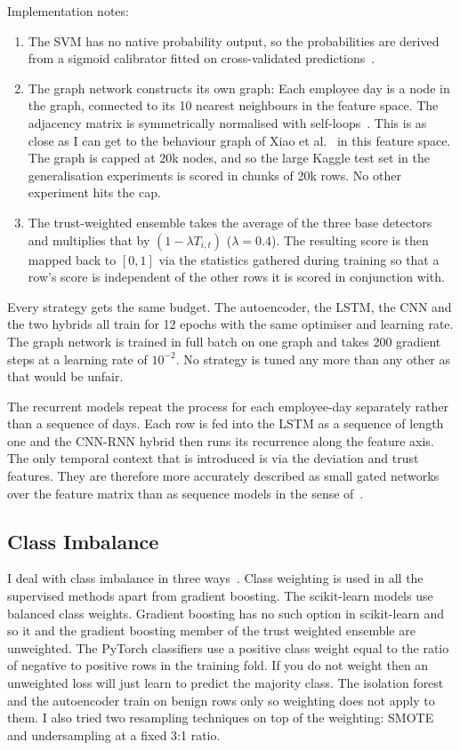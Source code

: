 \documentclass[a4paper,12pt]{article}
\begin{document}
Implementation notes:

\begin{enumerate}
  \item The SVM has no native probability output, so the probabilities are derived from a sigmoid calibrator fitted on cross-validated predictions~\cite{platt1999}.
  \item The graph network constructs its own graph: Each employee day is a node in the graph, connected to its 10 nearest neighbours in the feature space. The adjacency matrix is symmetrically normalised with self-loops~\cite{kipf2017}. This is as close as I can get to the behaviour graph of Xiao et al.~\cite{xiao2023} in this feature space. The graph is capped at 20k nodes, and so the large Kaggle test set in the generalisation experiments is scored in chunks of 20k rows. No other experiment hits the cap.
  \item The trust-weighted ensemble takes the average of the three base detectors and multiplies that by $(1-\lambda T_{i,t})$ ($\lambda=0.4$). The resulting score is then mapped back to $[0,1]$ via the statistics gathered during training so that a row's score is independent of the other rows it is scored in conjunction with.
\end{enumerate}
Every strategy gets the same budget. The autoencoder, the LSTM, the CNN and the two hybrids all train for 12 epochs with the same optimiser and learning rate. The graph network is trained in full batch on one graph and takes 200 gradient steps at a learning rate of $10^{-2}$. No strategy is tuned any more than any other as that would be unfair.

The recurrent models repeat the process for each employee-day separately rather than a sequence of days. Each row is fed into the LSTM as a sequence of length one and the CNN-RNN hybrid then runs its recurrence along the feature axis. The only temporal context that is introduced is via the deviation and trust features. They are therefore more accurately described as small gated networks over the feature matrix than as sequence models in the sense of~\cite{villarreal2023}.

\subsection{Class Imbalance}
\label{sec:6.6}

I deal with class imbalance in three ways~\cite{lemaitre2017}. Class weighting is used in all the supervised methods apart from gradient boosting. The scikit-learn models use balanced class weights. Gradient boosting has no such option in scikit-learn and so it and the gradient boosting member of the trust weighted ensemble are unweighted. The PyTorch classifiers use a positive class weight equal to the ratio of negative to positive rows in the training fold. If you do not weight then an unweighted loss will just learn to predict the majority class. The isolation forest and the autoencoder train on benign rows only so weighting does not apply to them. I also tried two resampling techniques on top of the weighting: SMOTE~\cite{chawla2002} and undersampling at a fixed 3:1 ratio.
\end{document}
